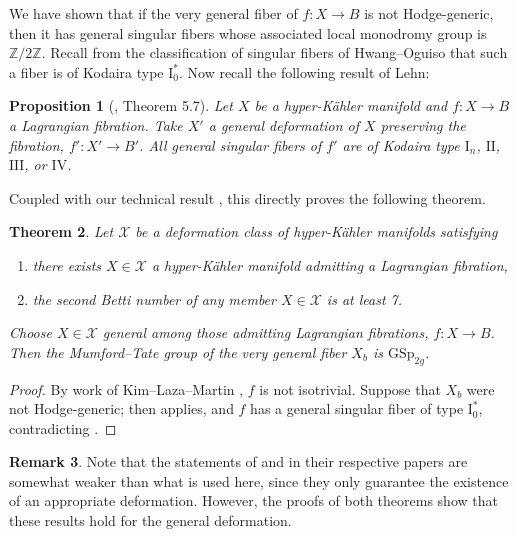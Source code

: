 \documentclass[12pt]{amsart}
\newcommand{\Z}{\mathbb{Z}}
\newtheorem{theorem}{Theorem}[section]
\newtheorem{proposition}[theorem]{Proposition}
\theoremstyle{definition}
\newtheorem{remark}[theorem]{Remark}
\numberwithin{equation}{section}
\begin{document}
We have shown that if the very general fiber of \(f: X \to B\) is not Hodge-generic, 
then it has general singular fibers whose associated local monodromy group is \(\Z/2\Z\).
Recall from the classification of singular fibers of Hwang--Oguiso \cite{hwang-oguiso09} 
that such a fiber is of Kodaira type \(\mathrm{I}_0^*\). Now recall the following result 
of Lehn:
\begin{proposition}[\cite{lehn2016}, Theorem 5.7] \label{lehn-general-singular-fibers}
    Let \(X\) be a hyper-K\"ahler manifold and \(f: X \to B\) a Lagrangian fibration.
    Take \(X'\) a general deformation of \(X\) preserving the fibration, \(f': X' \to B'\). 
    All general singular fibers of \(f'\) are of Kodaira type \(\mathrm{I}_n\), 
    \(\mathrm{II}\), \(\mathrm{III}\), or \(\mathrm{IV}\).
\end{proposition}

Coupled with our technical result , this directly proves 
the following theorem.

\begin{theorem} \label{general-mt-classification}
    Let \(\mathcal{X}\) be a deformation class of hyper-K\"ahler manifolds satisfying 
    \begin{enumerate}
        \item there exists \(X \in \mathcal{X}\) a hyper-K\"ahler manifold admitting a 
        Lagrangian fibration,
        \item the second Betti number of any member \(X \in \mathcal{X}\) is at least 7.
    \end{enumerate}
    Choose \(X \in \mathcal{X}\) general among those admitting Lagrangian fibrations,
    \(f: X \to B\). Then the Mumford--Tate group of the very general fiber \(X_b\) 
    is \(\mathrm{GSp}_{2g}\).
\end{theorem}

\begin{proof}
By work of Kim--Laza--Martin \cite[Theorem 6.2]{kim-laza-martin24}, \(f\) is not 
isotrivial. Suppose that \(X_b\) were not Hodge-generic; then 
applies, and \(f\) has a general singular fiber of type \(\mathrm{I}_0^*\), 
contradicting .
\end{proof}

\begin{remark}
Note that the statements of \cite[Theorem 5.7]{lehn2016} and 
\cite[Theorem 6.2]{kim-laza-martin24} in their respective papers are somewhat weaker 
than what is used here, since they only guarantee the existence of an appropriate
deformation. However, the proofs of both theorems show that these results hold for the 
general deformation.
\end{remark}




\end{document}

